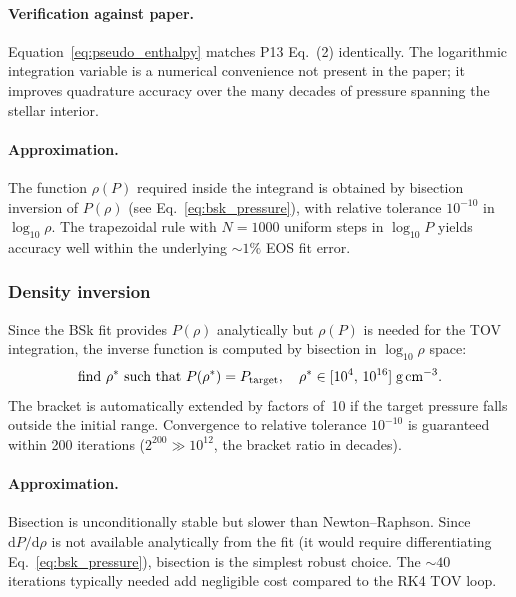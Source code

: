 \paragraph{Verification against paper.}
Equation~\eqref{eq:pseudo_enthalpy} matches P13 Eq.~(2) identically.
The logarithmic integration variable is a numerical convenience not
present in the paper; it improves quadrature accuracy over the many
decades of pressure spanning the stellar interior.

\paragraph{Approximation.}
The function $\rho(P)$ required inside the integrand is obtained by
bisection inversion of $P(\rho)$ (see Eq.~\ref{eq:bsk_pressure}), with
relative tolerance $10^{-10}$ in $\log_{10}\rho$.  The trapezoidal rule with
$N=1000$ uniform steps in $\log_{10}P$ yields accuracy well within the
underlying ${\sim}1\%$ EOS fit error.

\subsubsection{Density inversion}

Since the BSk fit provides $P(\rho)$ analytically but $\rho(P)$ is needed
for the TOV integration, the inverse function is computed by bisection in
$\log_{10}\rho$ space:
\begin{equation}
  \text{find } \rho^{*} \text{ such that }
  P(\rho^{*}) = P_{\text{target}},
  \quad \rho^{*}\in[10^{4},\,10^{16}]\;\text{g\,cm}^{-3}.
  \label{eq:bisection}
\end{equation}
The bracket is automatically extended by factors of~10 if the target
pressure falls outside the initial range.  Convergence to relative
tolerance $10^{-10}$ is guaranteed within 200 iterations
($2^{200}\gg10^{12}$, the bracket ratio in decades).

\paragraph{Approximation.}
Bisection is unconditionally stable but slower than Newton--Raphson.
Since $\mathrm{d}P/\mathrm{d}\rho$ is not available analytically from
the fit (it would require differentiating
Eq.~\ref{eq:bsk_pressure}), bisection is the simplest robust choice.
The ${\sim}40$ iterations typically needed add negligible cost compared to
the RK4 TOV loop.


